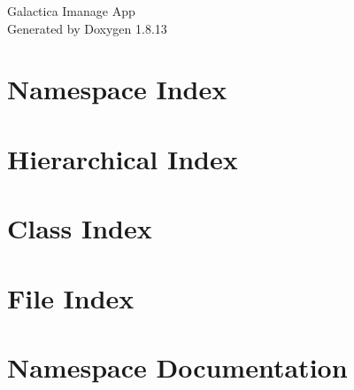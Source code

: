 \documentclass[twoside]{book}
\newcommand{\+}{\discretionary{\mbox{\scriptsize$\hookleftarrow$}}{}{}}
\newcommand{\clearemptydoublepage}{%
  \newpage{\pagestyle{empty}\cleardoublepage}%
}
\begin{document}
\hypersetup{pageanchor=false,
             bookmarksnumbered=true,
             pdfencoding=unicode
            }
\begin{titlepage}
\vspace*{7cm}
\begin{center}%
{\Large Galactica Imanage App }\\
\vspace*{1cm}
{\large Generated by Doxygen 1.8.13}\\
\end{center}
\end{titlepage}
\clearemptydoublepage
{}
\tableofcontents
\clearemptydoublepage
{}
\hypersetup{pageanchor=true}

\chapter{Namespace Index}

\chapter{Hierarchical Index}

\chapter{Class Index}

\chapter{File Index}

\chapter{Namespace Documentation}































\end{document}
